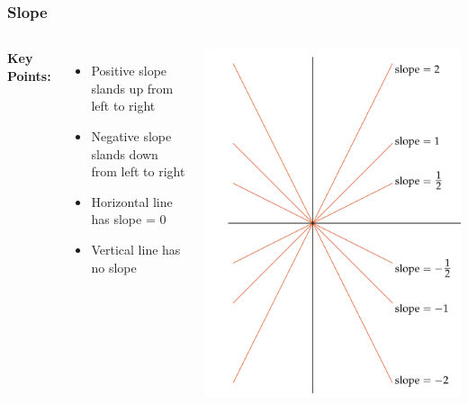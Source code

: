 \documentclass{beamer}
\begin{document}
  \begin{frame}
    \frametitle{Slope}
    
    \begin{columns} 
      \textbf{Key Points:}
      \begin{itemize}
          \item Positive slope slands up from left to right 
          \item Negative slope slands down from left to right 
          \item Horizontal line has slope = 0
          \item Vertical line has no slope
      \end{itemize}
  
      \centering
      \includegraphics[width=0.8\linewidth]{slope2.png} %
  \end{columns}
  \end{frame}
\end{document}
